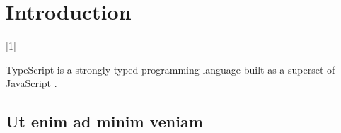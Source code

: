 \chapter*{Introduction}
\setcounter{page}{1}

\begin{chapterabstract}
  \lipsum[1]
\end{chapterabstract}

\lipsum[2][1-4]{} [1]

TypeScript is a strongly typed programming language built as a superset of JavaScript \cite{DocumentationTypeScriptJavaScript}.

\section{Ut enim ad minim veniam}

\lipsum[6-7]

